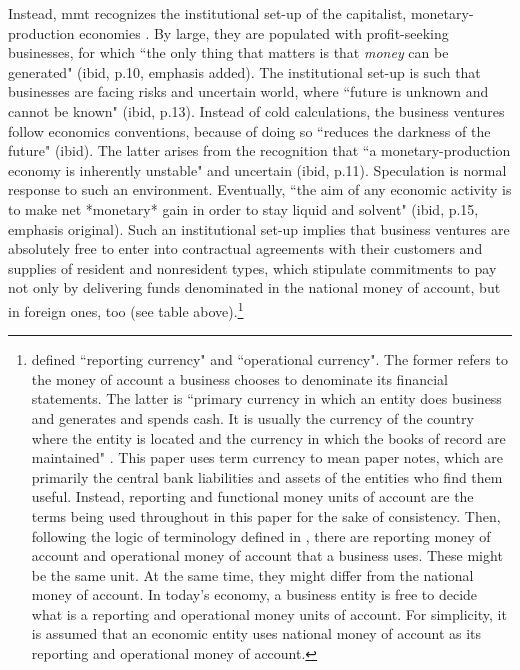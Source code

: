 Instead, \ac{mmt} recognizes the institutional set-up of the capitalist,
monetary-production economies \citep[pp.~10-17]{tymoigne2014}. By large, they are
populated with profit-seeking businesses, for which ``the only thing that
matters is that \textit{money} can be generated" (ibid, p.10, emphasis added).
The institutional set-up is such that businesses are facing risks and
uncertain world, where ``future is unknown and cannot be known" (ibid,
p.13). Instead of cold calculations, the business ventures follow
economics conventions, because of doing so ``reduces the darkness of the
future" (ibid). The latter arises from the recognition that ``a
monetary-production economy is inherently unstable" and uncertain (ibid,
p.11). Speculation is normal response to such an environment.
Eventually, ``the aim of any economic activity is to make net *monetary*
gain in order to stay liquid and solvent" (ibid, p.15, emphasis
original). Such an institutional set-up implies that business ventures
are absolutely free to enter into contractual agreements with their
customers and supplies of resident and nonresident types, which
stipulate commitments to pay not only by delivering funds denominated in
the national money of account, but in foreign ones, too (see table
above).\footnote{\cite{intl_acc} defined ``reporting currency" and ``operational currency".
    The former refers to the money of account a business chooses to
    denominate its financial statements. The latter is ``primary currency
    in which an entity does business and generates and spends cash. It
    is usually the currency of the country where the entity is located
    and the currency in which the books of record are maintained" \citep[p.~171]{intl_acc}. This paper uses term currency to mean paper notes, which are
    primarily the central bank liabilities and assets of the entities
    who find them useful. Instead, reporting and functional money units
    of account are the terms being used throughout in this paper for the
    sake of consistency. Then, following the logic of terminology
    defined in \citep{intl_acc}, there are reporting money of account and
    operational money of account that a business uses. These might be
    the same unit. At the same time, they might differ from the national
    money of account. In today's economy, a business entity is free
    to decide what is a reporting and operational money units of
    account. For simplicity, it is assumed that an economic entity uses
    national money of account as its reporting and operational
    money of account.}

